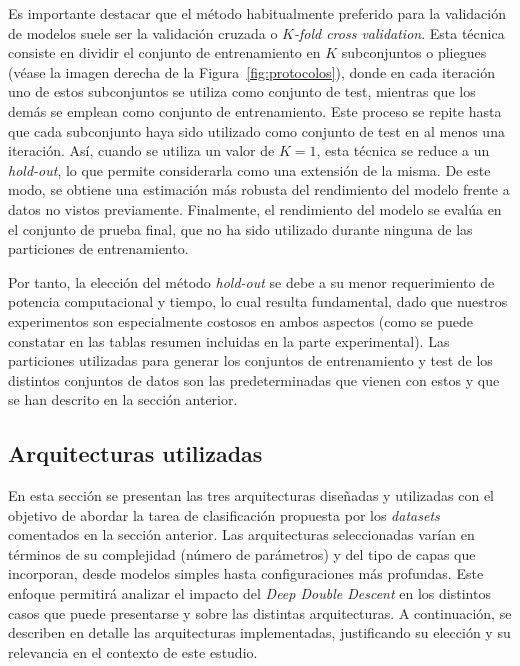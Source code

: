 Es importante destacar que el método habitualmente preferido para la validación de modelos suele ser la validación cruzada o \textit{$K$-fold cross validation}. Esta técnica consiste en dividir el conjunto de entrenamiento en $K$ subconjuntos o pliegues (véase la imagen derecha de la Figura~\ref{fig:protocolos}), donde en cada iteración uno de estos subconjuntos se utiliza como conjunto de test, mientras que los demás se emplean como conjunto de entrenamiento. Este proceso se repite hasta que cada subconjunto haya sido utilizado como conjunto de test en al menos una iteración. Así, cuando se utiliza un valor de $K = 1$, esta técnica se reduce a un \textit{hold-out}, lo que permite considerarla como una extensión de la misma. De este modo, se obtiene una estimación más robusta del rendimiento del modelo frente a datos no vistos previamente. Finalmente, el rendimiento del modelo se evalúa en el conjunto de prueba final, que no ha sido utilizado durante ninguna de las particiones de entrenamiento.

Por tanto, la elección del método \textit{hold-out} se debe a su menor requerimiento de potencia computacional y tiempo, lo cual resulta fundamental, dado que nuestros experimentos son especialmente costosos en ambos aspectos (como se puede constatar en las tablas resumen incluidas en la parte experimental). Las particiones utilizadas para generar los conjuntos de entrenamiento y test de los distintos conjuntos de datos son las predeterminadas que vienen con estos y que se han descrito en la sección anterior.

\subsection{Arquitecturas utilizadas}\label{subsec:arquitecturas}

En esta sección se presentan las tres arquitecturas diseñadas y utilizadas con el objetivo de abordar la tarea de clasificación propuesta por los \textit{datasets} comentados en la sección anterior. Las arquitecturas seleccionadas varían en términos de su complejidad (número de parámetros) y del tipo de capas que incorporan, desde modelos simples hasta configuraciones más profundas. Este enfoque permitirá analizar el impacto del \textit{Deep Double Descent} en los distintos casos que puede presentarse y sobre las distintas arquitecturas. A continuación, se describen en detalle las arquitecturas implementadas, justificando su elección y su relevancia en el contexto de este estudio.

